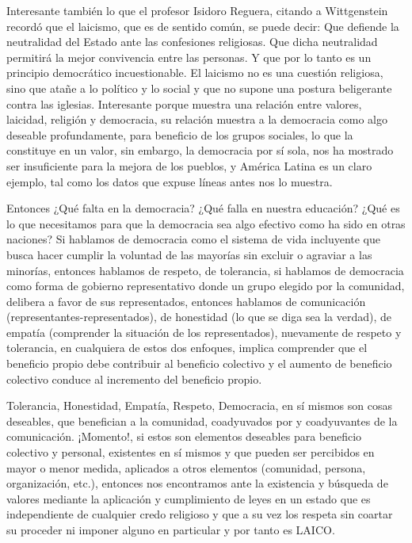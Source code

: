 Interesante también lo que el profesor Isidoro Reguera, citando a Wittgenstein recordó que el laicismo, que es de sentido común, se puede decir: Que defiende la neutralidad del Estado ante las confesiones religiosas. Que dicha neutralidad permitirá la mejor convivencia entre las personas. Y que por lo tanto es un principio democrático incuestionable. El laicismo no es una cuestión religiosa, sino que atañe a lo político y lo social y que no supone una postura beligerante contra las iglesias. Interesante porque muestra una relación entre valores, laicidad, religión y democracia, su relación muestra a la democracia como algo deseable profundamente, para beneficio de los grupos sociales, lo que la constituye en un valor, sin embargo, la democracia por sí sola, nos ha mostrado ser insuficiente para la mejora de los pueblos, y América Latina es un claro ejemplo, tal como los datos que expuse líneas antes nos lo muestra.

Entonces ¿Qué falta en la democracia? ¿Qué falla en nuestra educación? ¿Qué es lo que necesitamos para que la democracia sea algo efectivo como ha sido en otras naciones? Si hablamos de democracia como el sistema de vida incluyente que busca hacer cumplir la voluntad de las mayorías sin excluir o agraviar a las minorías, entonces hablamos de respeto, de tolerancia, si hablamos de democracia como forma de gobierno representativo donde un grupo elegido por la comunidad, delibera a favor de sus representados, entonces hablamos de comunicación (representantes-representados), de honestidad (lo que se diga sea la verdad), de empatía (comprender la situación de los representados), nuevamente de respeto y tolerancia, en cualquiera de estos dos enfoques, implica comprender que el beneficio propio debe contribuir al beneficio colectivo y el aumento de beneficio colectivo conduce al incremento del beneficio propio.

Tolerancia, Honestidad, Empatía, Respeto, Democracia, en sí mismos son cosas deseables, que benefician a la comunidad, coadyuvados por y coadyuvantes de la comunicación. ¡Momento!, si estos son elementos deseables para beneficio colectivo y personal, existentes en sí mismos y que pueden ser percibidos en mayor o menor medida, aplicados a otros elementos (comunidad, persona, organización, etc.), entonces nos encontramos ante la existencia y búsqueda de valores mediante la aplicación y cumplimiento de leyes en un estado que es independiente de cualquier credo religioso y que a su vez los respeta sin coartar su proceder ni imponer alguno en particular y por tanto es LAICO.

